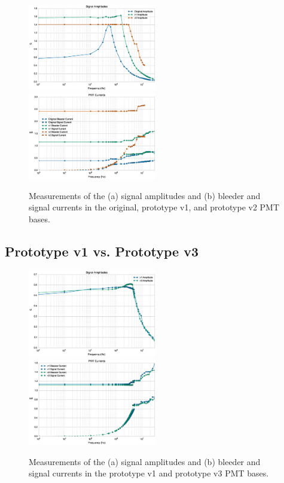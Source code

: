 \begin{figure}[h]
	\centerline{
		\mbox{\includegraphics[width=0.5\textwidth]{figures/Test_v2_Amp.eps} \includegraphics[width=0.5\textwidth]{figures/Test_v2_Current.eps}}}
	\caption{Measurements of the (a) signal amplitudes and (b) bleeder and signal currents in the original, prototype v1, and prototype v2 PMT bases.}
	\label{fig:test-v2}
\end{figure}



\subsection{Prototype v1 vs. Prototype v3}

\begin{figure}[h]
	\centerline{
		\mbox{\includegraphics[width=0.5\textwidth]{figures/Test_v3_Amp.eps} \includegraphics[width=0.5\textwidth]{figures/Test_v3_Current.eps}}}
	\caption{Measurements of the (a) signal amplitudes and (b) bleeder and signal currents in the prototype v1 and prototype v3 PMT bases.}
	\label{fig:test-v3}
\end{figure}


